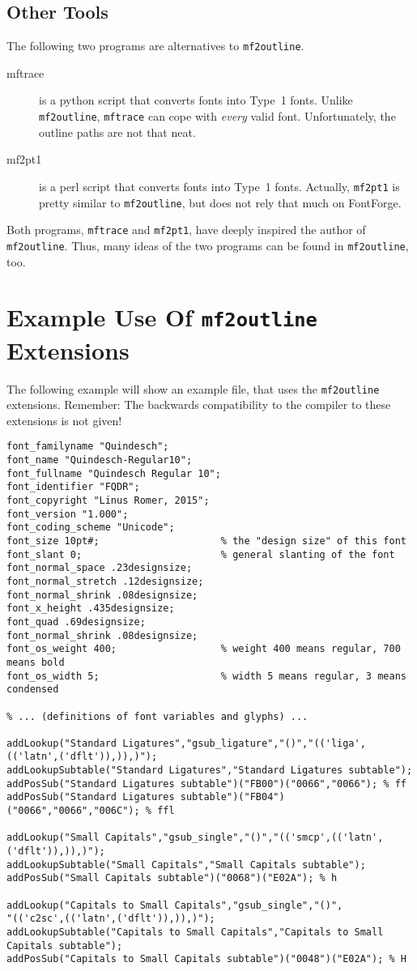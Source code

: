 \documentclass{scrartcl}
\begin{document}
\subsection{Other Tools}
%
The following two programs are alternatives to \verb|mf2outline|.
%
\begin{description}
	\item[mftrace] is a python script that converts \MF{} fonts into Type~1 fonts. Unlike \verb|mf2outline|, \verb|mftrace| can cope with \emph{every} valid \MF{} font. Unfortunately, the outline paths are not that neat.
	\item[mf2pt1] is a perl script that converts \MF{} fonts into Type~1 fonts. Actually, \verb|mf2pt1| is pretty similar to \verb|mf2outline|, but does not rely that much on FontForge.
\end{description}
%
Both programs, \verb|mftrace| and \verb|mf2pt1|, have deeply inspired the author of \verb|mf2outline|. Thus, many ideas of the two programs can be found in \verb|mf2outline|, too.
%
\section{Example Use Of \texttt{mf2outline} Extensions}
%
The following example will show an example \MF{} file, that uses the \texttt{mf2outline} extensions. Remember: The backwards compatibility to the \MF{} compiler to these extensions is not given! 
\lstset{columns=fullflexible}
\begin{lstlisting}
font_familyname "Quindesch";
font_name "Quindesch-Regular10";
font_fullname "Quindesch Regular 10";
font_identifier "FQDR";
font_copyright "Linus Romer, 2015";
font_version "1.000";
font_coding_scheme "Unicode";
font_size 10pt#;                     % the "design size" of this font 
font_slant 0;                        % general slanting of the font   
font_normal_space .23designsize;
font_normal_stretch .12designsize;
font_normal_shrink .08designsize;
font_x_height .435designsize;
font_quad .69designsize;
font_normal_shrink .08designsize;
font_os_weight 400;                  % weight 400 means regular, 700 means bold
font_os_width 5;                     % width 5 means regular, 3 means condensed

% ... (definitions of font variables and glyphs) ...

addLookup("Standard Ligatures","gsub_ligature","()","(('liga',(('latn',('dflt')),)),)");
addLookupSubtable("Standard Ligatures","Standard Ligatures subtable");
addPosSub("Standard Ligatures subtable")("FB00")("0066","0066"); % ff
addPosSub("Standard Ligatures subtable")("FB04")("0066","0066","006C"); % ffl

addLookup("Small Capitals","gsub_single","()","(('smcp',(('latn',('dflt')),)),)");
addLookupSubtable("Small Capitals","Small Capitals subtable");
addPosSub("Small Capitals subtable")("0068")("E02A"); % h

addLookup("Capitals to Small Capitals","gsub_single","()",
"(('c2sc',(('latn',('dflt')),)),)");
addLookupSubtable("Capitals to Small Capitals","Capitals to Small Capitals subtable");
addPosSub("Capitals to Small Capitals subtable")("0048")("E02A"); % H
\end{lstlisting}
%
\end{document}
